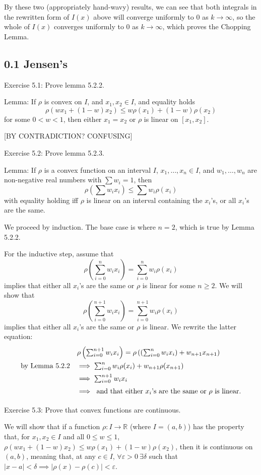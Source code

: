 \documentclass[11pt]{article}
\newcommand{\R}{\mathbb{R}}
\begin{document}
By these two (appropriately hand-wavy) results, we can see that both integrals
in the rewritten form of $I(x)$ above will converge uniformly to 0
as $k\to\infty$, so the whole of $I(x)$ converges uniformly to 0 as
$k\to\infty$, which proves the Chopping Lemma.

\subsection*{0.1 Jensen's}

Exercise 5.1: Prove lemma 5.2.2.

Lemma: If $\rho$ is convex on $I$, and $x_1,x_2\in I$, and equality holds
\[
    \rho(wx_1+(1-w)x_2)\leq w\rho(x_1)+(1-w)\rho(x_2)
\]
for some $0<w<1$, then either $x_1=x_2$ or $\rho$ is linear on $[x_1,x_2]$.

[BY CONTRADICTION? CONFUSING]

Exercise 5.2: Prove lemma 5.2.3.

Lemma: If $\rho$ is a convex function on an interval $I$,
$x_1,\ldots,x_n\in I$,
and $w_1,\ldots,w_n$ are non-negative real numbers with $\sum w_i=1$, then
\[
    \rho\left(\sum w_ix_i\right)\leq\sum w_i\rho(x_i)
\]
with equality holding iff $\rho$ is linear on an interval containing the
$x_i$'s, or all $x_i$'s are the same.

We proceed by induction. The base case is where $n=2$, which is true by
Lemma 5.2.2.

For the inductive step, assume that 
\[
    \rho\left(\sum_{i=0}^n w_ix_i\right)=\sum_{i=0}^n w_i\rho(x_i)
\]
implies that either all $x_i$'s are the same or $\rho$ is linear 
for some $n\geq2$. We will show that
\[
    \rho\left(\sum_{i=0}^{n+1} w_ix_i\right)=\sum_{i=0}^{n+1} w_i\rho(x_i)
\]
implies that either all $x_i$'s are the same or $\rho$ is linear.
We rewrite the latter equation:
\[
\def\arraystretch{1.5}
\begin{array}{rl}
& \rho\left(\sum_{i=0}^{n+1}w_ix_i\right) =
    \rho\left(\left(\sum_{i=0}^nw_ix_i\right)+w_{n+1}x_{n+1}\right) \\
\textrm{by Lemma 5.2.2}&\implies \sum_{i=0}^nw_i\rho(x_i)+w_{n+1}\rho(x_{n+1}) \\
&\implies \sum_{i=0}^{n+1}w_ix_i \\
&\implies \textrm{ and that either $x_i$'s are the same or $\rho$ is linear.}
\end{array}
\]

Exercise 5.3: Prove that convex functions are continuous.

We will show that if a function $\rho:I\to\R$ (where $I=(a,b)$) has the property that, for
$x_1,x_2\in I$ and all $0\leq w\leq1$,
$\rho(wx_1+(1-w)x_2)\leq w\rho(x_1)+(1-w)\rho(x_2)$,
then it is continuous on $(a,b)$, meaning that, at any $c\in I$,
$\forall \varepsilon>0\ \exists\delta$ such that
$|x-a|<\delta\implies|\rho(x)-\rho(c)|<\varepsilon$.
\end{document}
